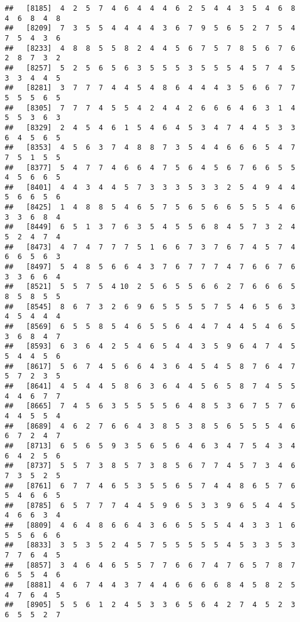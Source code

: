 \documentclass[
]{book}
\begin{document}
\begin{verbatim}
##   [8185]  4  2  5  7  4  6  4  4  4  6  2  5  4  4  3  5  4  6  8  4  6  8  4  8
##   [8209]  7  3  5  5  4  4  4  4  3  6  7  9  5  6  5  2  7  5  4  7  5  4  3  6
##   [8233]  4  8  8  5  5  8  2  4  4  5  6  7  5  7  8  5  6  7  6  2  8  7  3  2
##   [8257]  5  2  5  6  5  6  3  5  5  5  3  5  5  5  4  5  7  4  5  3  3  4  4  5
##   [8281]  3  7  7  7  4  4  5  4  8  6  4  4  4  3  5  6  6  7  7  5  5  5  6  5
##   [8305]  7  7  7  4  5  5  4  2  4  4  2  6  6  6  4  6  3  1  4  5  5  3  6  3
##   [8329]  2  4  5  4  6  1  5  4  6  4  5  3  4  7  4  4  5  3  3  6  4  5  6  5
##   [8353]  4  5  6  3  7  4  8  8  7  3  5  4  4  6  6  6  5  4  7  7  5  1  5  5
##   [8377]  5  4  7  7  4  6  6  4  7  5  6  4  5  6  7  6  6  5  5  4  5  6  6  5
##   [8401]  4  4  3  4  4  5  7  3  3  3  5  3  3  2  5  4  9  4  4  5  6  6  5  6
##   [8425]  1  4  8  8  5  4  6  5  7  5  6  5  6  6  5  5  5  4  6  3  3  6  8  4
##   [8449]  6  5  1  3  7  6  3  5  4  5  5  6  8  4  5  7  3  2  4  5  2  4  7  4
##   [8473]  4  7  4  7  7  7  5  1  6  6  7  3  7  6  7  4  5  7  4  6  6  5  6  3
##   [8497]  5  4  8  5  6  6  4  3  7  6  7  7  7  4  7  6  6  7  6  3  3  6  6  4
##   [8521]  5  5  7  5  4 10  2  5  6  5  5  6  6  2  7  6  6  6  5  8  5  8  5  5
##   [8545]  8  6  7  3  2  6  9  6  5  5  5  5  7  5  4  6  5  6  3  4  5  4  4  4
##   [8569]  6  5  5  8  5  4  6  5  5  6  4  4  7  4  4  5  4  6  5  3  6  8  4  7
##   [8593]  6  3  6  4  2  5  4  6  5  4  4  3  5  9  6  4  7  4  5  5  4  4  5  6
##   [8617]  5  6  7  4  5  6  6  4  3  6  4  5  4  5  8  7  6  4  7  5  7  2  3  5
##   [8641]  4  5  4  4  5  8  6  3  6  4  4  5  6  5  8  7  4  5  5  4  4  6  7  7
##   [8665]  7  4  5  6  3  5  5  5  5  6  4  8  5  3  6  7  5  7  6  4  4  5  5  4
##   [8689]  4  6  2  7  6  6  4  3  8  5  3  8  5  6  5  5  5  4  6  6  7  2  4  7
##   [8713]  6  5  6  5  9  3  5  6  5  6  4  6  3  4  7  5  4  3  4  6  4  2  5  6
##   [8737]  5  5  7  3  8  5  7  3  8  5  6  7  7  4  5  7  3  4  6  7  3  5  2  5
##   [8761]  6  7  7  4  6  5  3  5  5  6  5  7  4  4  8  6  5  7  6  5  4  6  6  5
##   [8785]  6  5  7  7  7  4  4  5  9  6  5  3  3  9  6  5  4  4  5  4  6  6  3  4
##   [8809]  4  6  4  8  6  6  4  3  6  6  5  5  5  4  4  3  3  1  6  5  5  6  6  6
##   [8833]  3  5  3  5  2  4  5  7  5  5  5  5  5  4  5  3  3  5  3  7  7  6  4  5
##   [8857]  3  4  6  4  6  5  5  7  7  6  6  7  4  7  6  5  7  8  7  6  5  5  4  6
##   [8881]  4  6  7  4  4  3  7  4  4  6  6  6  6  8  4  5  8  2  5  4  7  6  4  5
##   [8905]  5  5  6  1  2  4  5  3  3  6  5  6  4  2  7  4  5  2  3  6  5  5  2  7

\end{verbatim}
\end{document}
